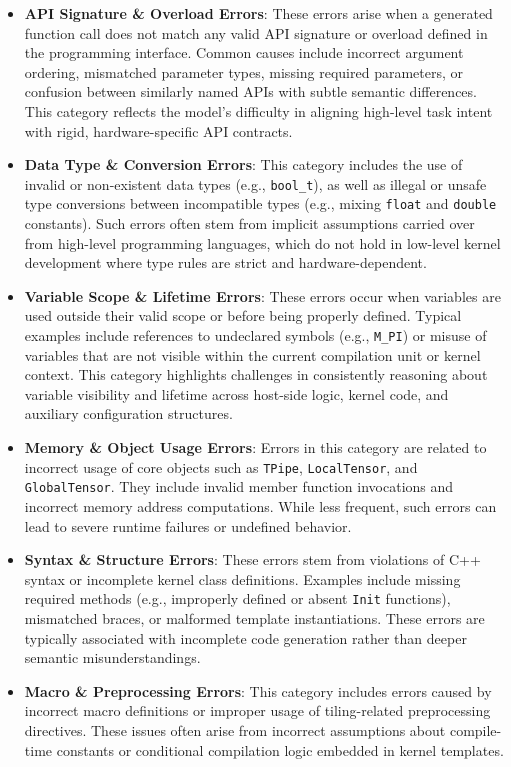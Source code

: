 \begin{itemize}
    \item \textbf{API Signature \& Overload Errors}: These errors arise when a generated function call does not match any valid API signature or overload defined in the programming interface. Common causes include incorrect argument ordering, mismatched parameter types, missing required parameters, or confusion between similarly named APIs with subtle semantic differences. This category reflects the model’s difficulty in aligning high-level task intent with rigid, hardware-specific API contracts.
    
    \item \textbf{Data Type \& Conversion Errors}: This category includes the use of invalid or non-existent data types (e.g., \texttt{bool\_t}), as well as illegal or unsafe type conversions between incompatible types (e.g., mixing \texttt{float} and \texttt{double} constants). Such errors often stem from implicit assumptions carried over from high-level programming languages, which do not hold in low-level kernel development where type rules are strict and hardware-dependent.

    \item \textbf{Variable Scope \& Lifetime Errors}: These errors occur when variables are used outside their valid scope or before being properly defined. Typical examples include references to undeclared symbols (e.g., \texttt{M\_PI}) or misuse of variables that are not visible within the current compilation unit or kernel context. This category highlights challenges in consistently reasoning about variable visibility and lifetime across host-side logic, kernel code, and auxiliary configuration structures.
    
    \item \textbf{Memory \& Object Usage Errors}: Errors in this category are related to incorrect usage of core objects such as \texttt{TPipe}, \texttt{LocalTensor}, and \texttt{GlobalTensor}. They include invalid member function invocations and incorrect memory address computations. While less frequent, such errors can lead to severe runtime failures or undefined behavior.

    \item \textbf{Syntax \& Structure Errors}: These errors stem from violations of C++ syntax or incomplete kernel class definitions. Examples include missing required methods (e.g., improperly defined or absent \texttt{Init} functions), mismatched braces, or malformed template instantiations.
    These errors are typically associated with incomplete code generation rather than deeper semantic misunderstandings.

    \item \textbf{Macro \& Preprocessing Errors}: This category includes errors caused by incorrect macro definitions or improper usage of tiling-related preprocessing directives. These issues often arise from incorrect assumptions about compile-time constants or conditional compilation logic embedded in kernel templates.

\end{itemize}

